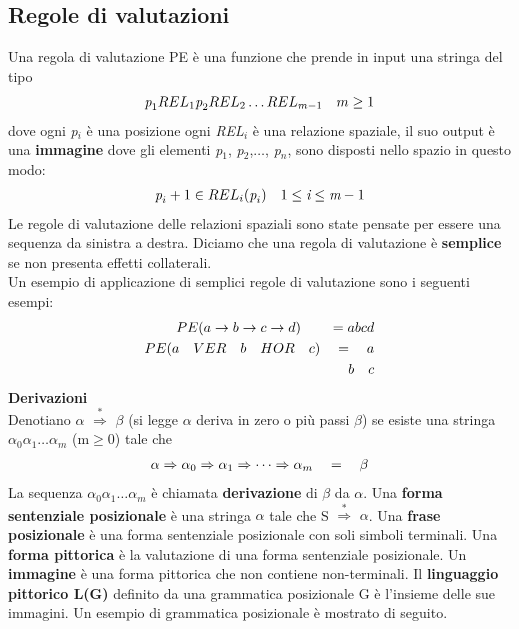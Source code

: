\subsection{Regole di valutazioni}
Una regola di valutazione PE \cite{pubblicazione: tomita} è una funzione che prende in input una stringa del tipo 
\begin{align}
	\textit{p}_1 REL_1 \textit{p}_2 REL_2 \dots REL_{m-1} \quad    m \ge 1 \notag
\end{align}
dove ogni \textit{p}$_i$ è una posizione ogni \textit{REL}$_i$ è una relazione spaziale, il suo output è una \textbf{immagine} dove gli elementi \textit{p}$_1$, \textit{p}$_2$,$\dots$, \textit{p}$_n$, sono disposti nello spazio in questo modo:
\begin{align}
	\textit{p}_i+1 \in REL_i (\textit{p}_i)  \quad    1\le \textit{i} \le \textit{m}-1 \notag
\end{align}
Le regole di valutazione delle relazioni spaziali sono state pensate per essere una sequenza da sinistra a destra. Diciamo che una regola di valutazione è \textbf{semplice} se non presenta effetti collaterali. \\
Un esempio di applicazione di semplici regole di valutazione sono i seguenti esempi:
\begin{align}
	PE(a \to b \to c \to d) \quad \quad = a b c d \notag \\ 
		PE(a \quad VER \quad b \quad HOR \quad c) \quad  = \quad a \notag \\ 
		                                                              b \quad  c \notag 
\end{align}
\textbf{Derivazioni}\\
Denotiano $\alpha$ $\overset{*}{\Rightarrow}$ $\beta$ (si legge  $\alpha$ deriva in zero o più passi $\beta$) se esiste una stringa $\alpha_0$$\alpha_1$$\dots$$\alpha_m$ (m$\ge$0) tale che
\begin{align}
	\alpha \Rightarrow \alpha_0 \Rightarrow \alpha_1 \Rightarrow \dots \Rightarrow  \alpha_m \quad = \quad \beta  \notag
\end{align}
La sequenza $\alpha_0$$\alpha_1$$\dots$$\alpha_m$ è chiamata \textbf{derivazione} di $\beta$ da $\alpha$. Una \textbf{forma sentenziale posizionale} è una stringa $\alpha$ tale che S $\overset{*}{\Rightarrow}$ $\alpha$. Una \textbf{frase posizionale} è una forma sentenziale posizionale con soli simboli terminali. Una \textbf{forma pittorica} è la valutazione di una forma sentenziale posizionale. Un \textbf{immagine} è una forma pittorica che non contiene non-terminali. Il \textbf{linguaggio pittorico L(G)} definito da una grammatica posizionale G è l'insieme delle sue immagini. Un esempio di grammatica posizionale è mostrato di seguito.
